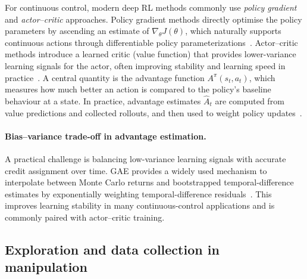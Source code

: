 For continuous control, modern deep \ac{RL} methods commonly use \emph{policy gradient} and \emph{actor--critic} approaches.
Policy gradient methods directly optimise the policy parameters by ascending an estimate of $\nabla_\theta J(\theta)$,
which naturally supports continuous actions through differentiable policy parameterizations~\cite{SuttonBarto2018}.
Actor--critic methods introduce a learned critic (value function) that provides lower-variance learning signals for the actor,
often improving stability and learning speed in practice~\cite{SuttonBarto2018}.
A central quantity is the advantage function $A^\pi(s_t,a_t)$, which measures how much better an action is compared to the
policy's baseline behaviour at a state. In practice, advantage estimates $\hat{A}_t$ are computed from value predictions
and collected rollouts, and then used to weight policy updates~\cite{SuttonBarto2018}.

\paragraph{Bias--variance trade-off in advantage estimation.}
A practical challenge is balancing low-variance learning signals with accurate credit assignment over time.
\ac{GAE} provides a widely used mechanism to interpolate between Monte Carlo returns
and bootstrapped temporal-difference estimates by exponentially weighting temporal-difference residuals~\cite{Schulman2015GAE}.
This improves learning stability in many continuous-control applications and is commonly paired with actor--critic training.

\subsection{Exploration and data collection in manipulation}
\label{sec:rl_exploration}


